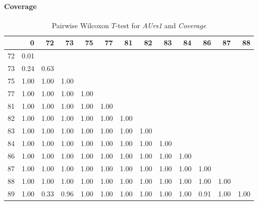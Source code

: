 \paragraph{Coverage}

\begin{table}[ht]
	\small
	\centering
    \begin{tabular}{rrrrrrrrrrrrr}
        \hline
        & 0 & 72 & 73 & 75 & 77 & 81 & 82 & 83 & 84 & 86 & 87 & 88 \\ 
        \hline
        72 & 0.01 &  &  &  &  &  &  &  &  &  &  &  \\ 
        73 & 0.24 & 0.63 &  &  &  &  &  &  &  &  &  &  \\ 
        75 & 1.00 & 1.00 & 1.00 &  &  &  &  &  &  &  &  &  \\ 
        77 & 1.00 & 1.00 & 1.00 & 1.00 &  &  &  &  &  &  &  &  \\ 
        81 & 1.00 & 1.00 & 1.00 & 1.00 & 1.00 &  &  &  &  &  &  &  \\ 
        82 & 1.00 & 1.00 & 1.00 & 1.00 & 1.00 & 1.00 &  &  &  &  &  &  \\ 
        83 & 1.00 & 1.00 & 1.00 & 1.00 & 1.00 & 1.00 & 1.00 &  &  &  &  &  \\ 
        84 & 1.00 & 1.00 & 1.00 & 1.00 & 1.00 & 1.00 & 1.00 & 1.00 &  &  &  &  \\ 
        86 & 1.00 & 1.00 & 1.00 & 1.00 & 1.00 & 1.00 & 1.00 & 1.00 & 1.00 &  &  &  \\ 
        87 & 1.00 & 1.00 & 1.00 & 1.00 & 1.00 & 1.00 & 1.00 & 1.00 & 1.00 & 1.00 &  &  \\ 
        88 & 1.00 & 1.00 & 1.00 & 1.00 & 1.00 & 1.00 & 1.00 & 1.00 & 1.00 & 1.00 & 1.00 &  \\ 
        89 & 1.00 & 0.33 & 0.96 & 1.00 & 1.00 & 1.00 & 1.00 & 1.00 & 1.00 & 0.91 & 1.00 & 1.00 \\ 
        \hline
    \end{tabular}
    \caption{Pairwise Wilcoxon $T$-test for \textit{AUrs1} and \textit{Coverage}}
    \label{tbl:wilcoxon_baysis_initiator_AUrs1_Cov}
\end{table}
